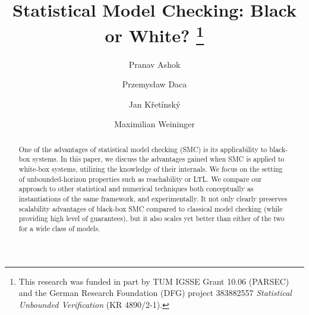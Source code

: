 \documentclass[runningheads]{llncs}
\title{Statistical Model Checking: Black or White?
\thanks{This research was funded in part by TUM IGSSE Grant 10.06 (PARSEC) and the German Research Foundation (DFG) project 383882557 \emph{Statistical Unbounded Verification} (KR 4890/2-1).}
}
\author{Pranav Ashok \and Przemys\l{}aw Daca \and Jan K\v ret\'insk\'y \and Maximilian Weininger}
\institute{Technical University of Munich, Germany}
\begin{document}
\maketitle


\begin{abstract}
One of the advantages of statistical model checking (SMC) is its applicability to black-box systems.
In this paper, we discuss the advantages gained when SMC is applied to white-box systems, utilizing the knowledge of their internals.
We focus on the setting of unbounded-horizon properties such as reachability or LTL.
We compare our approach to other statistical and numerical techniques both conceptually as instantiations of the same framework, and experimentally. 
It not only clearly preserves scalability advantages of black-box SMC compared to classical model checking (while providing high level of guarantees), but it also scales yet better than either of the two for a wide class of models.
\end{abstract} 

%



 

%









%


%
\end{document}
